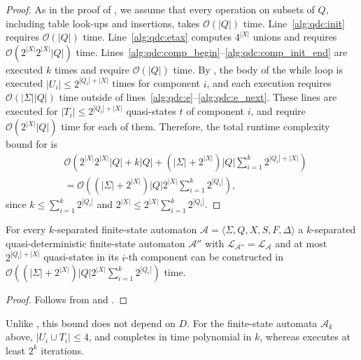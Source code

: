   \begin{proof}
    As in the proof of , we assume that every operation
    on subsets of $Q$, including table look-ups and insertions, takes $\mathcal{O}(|Q|)$
    time. Line~\ref{alg:qdc:init} requires $\mathcal{O}(|Q|)$ time.
    Line~\ref{alg:qdc:etax} computes $4^{|X|}$ unions and requires
    $\mathcal{O}(2^{|X|} 2^{|X|} |Q|)$ time.
    Lines~\ref{alg:qdc:comp_begin}--\ref{alg:qdc:comp_init_end} are executed $k$ times
    and require $\mathcal{O}(|Q|)$ time.
    By , the body of the while loop is executed
    $|U_i| \leq 2^{|Q_i| + |X|}$ times for component $i$, and each execution requires
    $\mathcal{O}(|\Sigma| |Q|)$ time outside of
    lines~\ref{alg:qdc:e}--\ref{alg:qdc:e_next}. These lines are executed for $|T_i|
    \leq 2^{|Q_i| + |X|}$ quasi-states $t$ of component $i$, and require
    $\mathcal{O}(2^{|X|} |Q|)$ time for each of them. Therefore, the total runtime
    complexity bound for  is
    \begin{align*}
      &\mathcal{O}(2^{|X|} 2^{|X|} |Q| + k |Q| + (|\Sigma| + 2^{|X|}) |Q|
      \sum_{i=1}^k 2^{|Q_i| + |X|})\\
      &= \mathcal{O}((|\Sigma| + 2^{|X|}) |Q| 2^{|X|} \sum_{i=1}^k 2^{|Q_i|}),
    \end{align*}
    since $k \leq \sum_{i=1}^k 2^{|Q_i|}$ and $2^{|X|} \leq 2^{|X|} \sum_{i=1}^k
    2^{|Q_i|}$.
  \end{proof}

  \begin{theorem}\label{thm:quasidet_components}
    For every $k$-separated finite-state automaton $\mathcal{A} = \langle \Sigma, Q, X,
    S, F, \Delta \rangle$ a $k$-separated quasi-deterministic finite-state automaton
    $\mathcal{A}''$ with $\mathcal{L}_{\mathcal{A}''} = \mathcal{L}_\mathcal{A}$ and at
    most $2^{|Q_i| + |X|}$ quasi-states in its $i$-th component can be constructed in
    $\mathcal{O}((|\Sigma| + 2^{|X|}) |Q| 2^{|X|} \sum_{i=1}^k 2^{|Q_i|})$ time.
  \end{theorem}

  \begin{proof}
    Follows from  and
    .
  \end{proof}

  Unlike , this bound does not depend on $D$. For the
  finite-state automata $\mathcal{A}_k$ above, $|U_i \cup T_i| \leq 4$, and
   completes in time polynomial in $k$, whereas
   executes at least $2^k$ iterations.

